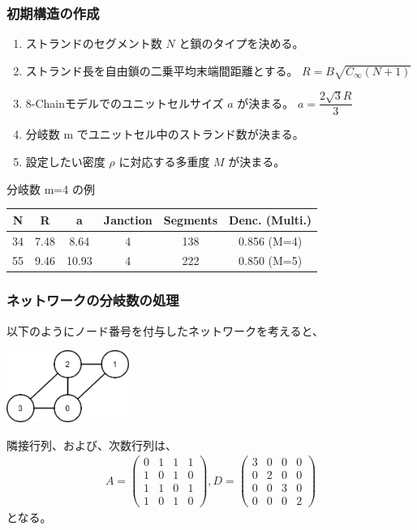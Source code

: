 \documentclass[11pt, dvipdfmx]{beamer}
\begin{document}
\begin{frame}
\frametitle{初期構造の作成}

\begin{enumerate}
\item
ストランドのセグメント数 $N$ と鎖のタイプを決める。
\item
ストランド長を自由鎖の二乗平均末端間距離とする。
$R=B\sqrt{C_{\infty}(N+1)}$
\item
8-Chainモデルでのユニットセルサイズ $a$ が決まる。
$a=\dfrac{2\sqrt{3}R}{3}$
\item
分岐数 m でユニットセル中のストランド数が決まる。
\item
設定したい密度 $\rho$ に対応する多重度 $M$ が決まる。
\end{enumerate}

分岐数 m=4 の例

\vspace{-1mm}
\renewcommand{\arraystretch}{1.5}
\begin{table}[htb]
 \centering
	\scriptsize
 \begin{tabular} {c c c c c c} \hline
 N		& R 		& a 		& Janction 	& Segments	& Denc. (Multi.) \\ \hline \hline
 34		& 7.48	& 8.64	& 4			& 138 		& 0.856 (M=4) \\ \hline
 55		& 9.46	& 10.93	& 4			& 222		& 0.850 (M=5) \\ \hline
\end{tabular}
\end{table}
\renewcommand{\arraystretch}{1.0}
\end{frame}
\begin{frame}
\frametitle{ネットワークの分岐数の処理}
以下のようにノード番号を付与したネットワークを考えると、
\begin{center}
\includegraphics[width=4cm]{./fig/NW-4.png}
\end{center}
隣接行列、および、次数行列は、
\begin{align*}
A = \left( 
\begin{array}{cccc} 
0 & 1 & 1 & 1 \\ 
1 & 0 & 1 & 0 \\
1 & 1 & 0 & 1 \\
1 & 0 & 1 & 0 
\end{array} 
\right) 
,
D = \left( 
\begin{array}{cccc} 
3 & 0 & 0 & 0 \\ 
0 & 2 & 0 & 0 \\
0 & 0 & 3 & 0 \\
0 & 0 & 0 & 2 
\end{array} 
\right) 
\end{align*}
となる。
\end{frame}
\end{document}
